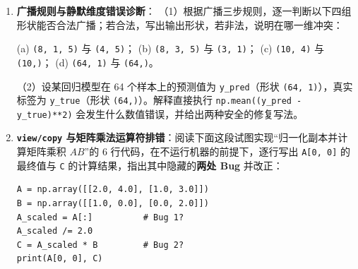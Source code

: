 
\begin{enumerate}[label=\textbf{1.\arabic*}]
  \item \textbf{广播规则与静默维度错误诊断}：
  （1）根据广播三步规则，逐一判断以下四组形状能否合法广播；若合法，写出输出形状，若非法，说明在哪一维冲突：
  \begin{center}
  (a) \texttt{(8, 1, 5)} 与 \texttt{(4, 5)}；\quad
  (b) \texttt{(8, 3, 5)} 与 \texttt{(3, 1)}；\quad
  (c) \texttt{(10, 4)} 与 \texttt{(10,)}；\quad
  (d) \texttt{(64, 1)} 与 \texttt{(64,)}。
  \end{center}
  （2）设某回归模型在 64 个样本上的预测值为 \texttt{y\_pred}（形状 \texttt{(64, 1)}），真实标签为 \texttt{y\_true}（形状 \texttt{(64,)}）。解释直接执行 \texttt{np.mean((y\_pred - y\_true)**2)} 会发生什么数值错误，并给出两种安全的修复写法。

  \item \textbf{\texttt{view/copy} 与矩阵乘法运算符排错}：阅读下面这段试图实现“归一化副本并计算矩阵乘积 $AB$”的 6 行代码，在不运行机器的前提下，逐行写出 \texttt{A[0, 0]} 的最终值与 \texttt{C} 的计算结果，指出其中隐藏的\textbf{两处 Bug} 并改正：
  \begin{lstlisting}[numbers=none]
A = np.array([[2.0, 4.0], [1.0, 3.0]])
B = np.array([[1.0, 0.0], [0.0, 2.0]])
A_scaled = A[:]          # Bug 1?
A_scaled /= 2.0
C = A_scaled * B         # Bug 2?
print(A[0, 0], C)
  \end{lstlisting}
\end{enumerate}


